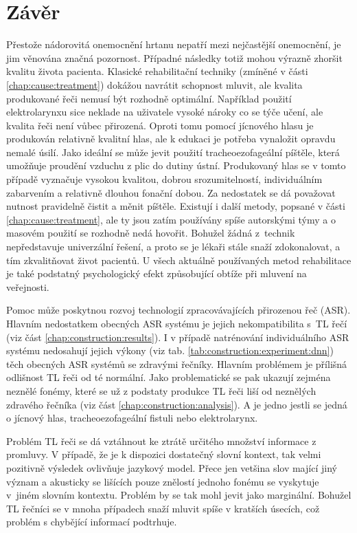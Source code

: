 \chapter{Závěr}
\label{chap:conclusion}

Přestože nádorovitá onemocnění hrtanu nepatří mezi nejčastější onemocnění, je
jim věnována značná pozornost. Případné následky totiž mohou výrazně zhoršit
kvalitu života pacienta. Klasické rehabilitační techniky (zmíněné v části
\ref{chap:cause:treatment}) dokážou navrátit schopnost mluvit, ale kvalita
produkované řeči nemusí být rozhodně optimální. Například použití
elektrolarynxu sice neklade na uživatele vysoké nároky co se týče učení, ale
kvalita řeči není vůbec přirozená. Oproti tomu pomocí jícnového hlasu je
produkován relativně kvalitní hlas, ale k edukaci je potřeba vynaložit opravdu
nemalé úsilí. Jako ideální se může jevit použití tracheoezofageální píštěle,
která umožňuje proudění vzduchu z plic do dutiny ústní. Produkovaný hlas se v
tomto případě vyznačuje vysokou kvalitou, dobrou srozumitelností,
individuálním zabarvením a relativně dlouhou fonační dobou. Za nedostatek se
dá považovat nutnost pravidelně čistit a měnit píštěle. Existují i další
metody, popsané v části \ref{chap:cause:treatment}, ale ty jsou zatím používány
spíše autorskými týmy a o masovém použití se rozhodně nedá hovořit. Bohužel
žádná z~technik nepředstavuje univerzální řešení, a proto se je lékaři
stále snaží zdokonalovat, a tím zkvalitňovat život pacientů. U všech aktuálně používaných metod rehabilitace je také podstatný psychologický efekt způsobující obtíže při mluvení na veřejnosti.

Pomoc může poskytnou rozvoj technologií zpracovávajících přirozenou řeč (ASR). Hlavním nedostatkem obecných ASR systému je jejich nekompatibilita s~TL řečí (viz část \ref{chap:construction:results}). I v případě natrénování individuálního ASR systému nedosahují jejich výkony (viz tab. \ref{tab:construction:experiment:dnn}) těch obecných ASR systémů se zdravými řečníky. Hlavním problémem je přílišná odlišnost TL řeči od té normální. Jako problematické se pak ukazují zejména neznělé fonémy, které se už z podstaty produkce TL řeči liší od neznělých zdravého řečníka (viz část \ref{chap:construction:analysis}). A je jedno jestli se jedná o jícnový hlas, tracheoezofageální fistuli nebo elektrolarynx.

Problém TL řeči se dá vztáhnout ke ztrátě určitého množství informace z promluvy. V případě, že je k dispozici dostatečný slovní kontext, tak velmi pozitivně výsledek ovlivňuje jazykový model. Přece jen vetšina slov mající jiný význam a akusticky se lišících pouze znělostí jednoho fonému se vyskytuje v~jiném slovním kontextu. Problém by se tak mohl jevit jako marginální. Bohužel TL řečníci se v mnoha případech snaží mluvit spíše v kratších úsecích, což problém s chybějící informací podtrhuje.

